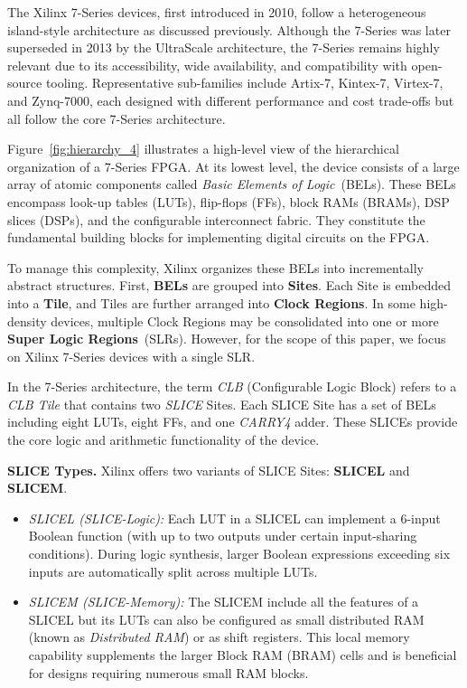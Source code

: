 \documentclass[twocolumn]{article}
\begin{document}
    The Xilinx 7-Series devices, first introduced in 2010, follow a heterogeneous island-style architecture as discussed previously. 
    Although the 7-Series was later superseded in 2013 by the UltraScale architecture, the 7-Series remains highly relevant due to its accessibility, wide availability, and compatibility with open-source tooling. 
    Representative sub-families include Artix-7, Kintex-7, Virtex-7, and Zynq-7000, each designed with different performance and cost trade-offs but all follow the core 7-Series architecture.

    Figure~\ref{fig:hierarchy_4} illustrates a high-level view of the hierarchical organization of a 7-Series FPGA. 
    At its lowest level, the device consists of a large array of atomic components called \emph{Basic Elements of Logic}~(BELs). 
    These BELs encompass look-up tables (LUTs), flip-flops (FFs), block RAMs (BRAMs), DSP slices (DSPs), and the configurable interconnect fabric. 
    They constitute the fundamental building blocks for implementing digital circuits on the FPGA.

    To manage this complexity, Xilinx organizes these BELs into incrementally abstract structures. 
    First, \textbf{BELs} are grouped into \textbf{Sites}. 
    Each Site is embedded into a \textbf{Tile}, and Tiles are further arranged into \textbf{Clock Regions}. 
    In some high-density devices, multiple Clock Regions may be consolidated into one or more \textbf{Super Logic Regions}~(SLRs). 
    However, for the scope of this paper, we focus on Xilinx 7-Series devices with a single SLR.

    In the 7-Series architecture, the term \emph{CLB} (Configurable Logic Block) refers to a \emph{CLB Tile} that contains two \emph{SLICE} Sites. 
    Each SLICE Site has a set of BELs including eight LUTs, eight FFs, and one \emph{CARRY4} adder. 
    These SLICEs provide the core logic and arithmetic functionality of the device.

    \textbf{SLICE Types.}\quad 
    Xilinx offers two variants of SLICE Sites: \textbf{SLICEL} and \textbf{SLICEM}.  
    \begin{itemize}
        \item \emph{SLICEL (SLICE-Logic):} Each LUT in a SLICEL can implement a 6-input Boolean function (with up to two outputs under certain input-sharing conditions). During logic synthesis, larger Boolean expressions exceeding six inputs are automatically split across multiple LUTs.
        \item \emph{SLICEM (SLICE-Memory):} The SLICEM include all the features of a SLICEL but its LUTs can also be configured as small distributed RAM (known as \emph{Distributed RAM}) or as shift registers. This local memory capability supplements the larger Block RAM (BRAM) cells and is beneficial for designs requiring numerous small RAM blocks.
    \end{itemize}
\end{document}
